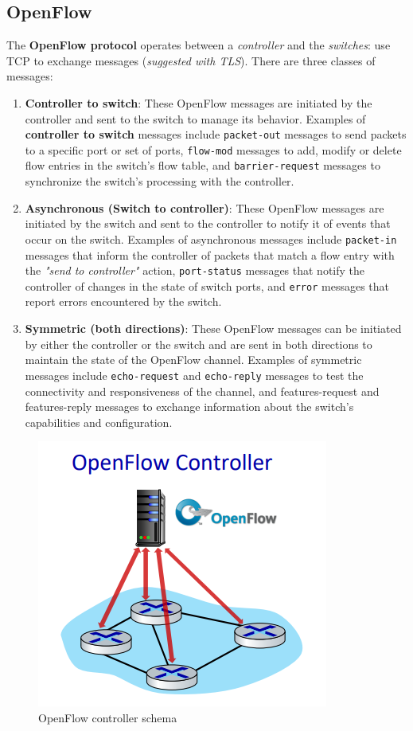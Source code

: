 \documentclass[10pt,a4paper]{report}
\theoremstyle{definition}
\begin{document}
\subsection{OpenFlow}\label{sec:openflow-protocol}
The \textbf{OpenFlow protocol} operates between a \textit{controller} and the \textit{switches}: use TCP to exchange messages (\textit{suggested with TLS}). There are three classes of messages:
\begin{enumerate}
	\item 
	\textbf{Controller to switch}: These OpenFlow messages are initiated by the controller and sent to the switch to manage its behavior. Examples of \textbf{controller to switch} messages include \texttt{packet-out} messages to send packets to a specific port or set of ports, \texttt{flow-mod} messages to add, modify or delete flow entries in the switch's flow table, and \texttt{barrier-request} messages to synchronize the switch's processing with the controller.
	\item 
	\textbf{Asynchronous (Switch to controller)}: These OpenFlow messages are initiated by the switch and sent to the controller to notify it of events that occur on the switch. Examples of asynchronous messages include \texttt{packet-in} messages that inform the controller of packets that match a flow entry with the \textit{"send to controller"} action, \texttt{port-status} messages that notify the controller of changes in the state of switch ports, and \texttt{error} messages that report errors encountered by the switch.
	\item 
	\textbf{Symmetric (both directions)}: These OpenFlow messages can be initiated by either the controller or the switch and are sent in both directions to maintain the state of the OpenFlow channel. Examples of symmetric messages include \texttt{echo-request} and \texttt{echo-reply} messages to test the connectivity and responsiveness of the channel, and features-request and features-reply messages to exchange information about the switch's capabilities and configuration.
\end{enumerate}

\begin{figure}
	\centering\includegraphics[scale=0.30]{images/Pasted image 20230324115601.png}
	\caption{OpenFlow controller schema}
\end{figure}
\end{document}
